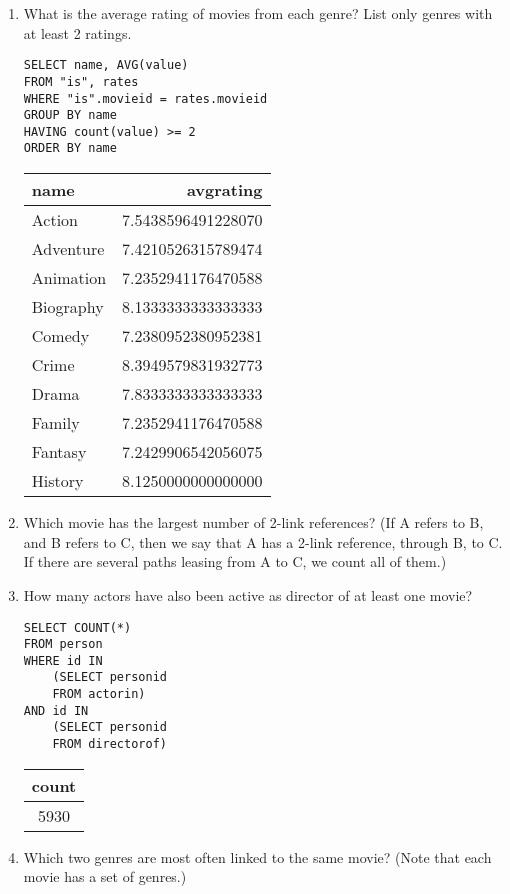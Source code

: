 \begin{enumerate}
\item What is the average rating of movies from each genre? List only genres with at least 2 ratings.

\begin{lstlisting}
SELECT name, AVG(value)
FROM "is", rates
WHERE "is".movieid = rates.movieid
GROUP BY name
HAVING count(value) >= 2
ORDER BY name
\end{lstlisting}

\begin{tabular}{|l|r|}
\hline
name & avgrating \\ \hline
Action & 7.5438596491228070 \\ \hline
Adventure & 7.4210526315789474 \\ \hline
Animation & 7.2352941176470588 \\ \hline
Biography & 8.1333333333333333 \\ \hline
Comedy & 7.2380952380952381 \\ \hline
Crime & 8.3949579831932773 \\ \hline
Drama & 7.8333333333333333 \\ \hline
Family & 7.2352941176470588 \\ \hline
Fantasy & 7.2429906542056075 \\ \hline
History & 8.1250000000000000 \\ \hline
\end{tabular}

\item Which movie has the largest number of 2-link references? (If A refers to B, and B refers to C, then we say that A has a 2-link reference, through B, to C. If there are several paths leasing from A to C, we count all of them.)
\item How many actors have also been active as director of at least one movie?

\begin{lstlisting}
SELECT COUNT(*)
FROM person
WHERE id IN
	(SELECT personid
	FROM actorin)
AND id IN
	(SELECT personid
	FROM directorof)
\end{lstlisting}

\begin{tabular}{|c|}
\hline
count \\ \hline
5930 \\ \hline
\end{tabular}

\item Which two genres are most often linked to the same movie? (Note that each movie has a set of genres.)
\end{enumerate}
